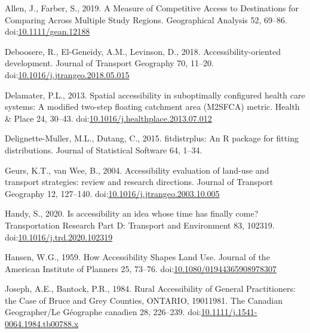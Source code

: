 \documentclass[]{elsarticle} %
\newlength{\cslhangindent}
\newlength{\cslentryspacingunit} %
\newenvironment{CSLReferences}[2] %
 {%
  \setlength{\parindent}{0pt}
  \ifodd #1
  \let\oldpar\par
  \def\par{\hangindent=\cslhangindent\oldpar}
  \fi
  \setlength{\parskip}{#2\cslentryspacingunit}
 }%
 {}
\begin{document}
\hypertarget{refs}{}
\begin{CSLReferences}{1}{0}
\leavevmode{}%
Allen, J., Farber, S., 2019. A Measure of Competitive Access to
Destinations for Comparing Across Multiple Study Regions. Geographical
Analysis 52, 69--86.
doi:\href{https://doi.org/10.1111/gean.12188}{10.1111/gean.12188}

\leavevmode{}%
Deboosere, R., El-Geneidy, A.M., Levinson, D., 2018.
Accessibility-oriented development. Journal of Transport Geography 70,
11--20.
doi:\href{https://doi.org/10.1016/j.jtrangeo.2018.05.015}{10.1016/j.jtrangeo.2018.05.015}

\leavevmode{}%
Delamater, P.L., 2013. Spatial accessibility in suboptimally configured
health care systems: A modified two-step floating catchment area
(M2SFCA) metric. Health \& Place 24, 30--43.
doi:\href{https://doi.org/10.1016/j.healthplace.2013.07.012}{10.1016/j.healthplace.2013.07.012}

\leavevmode{}%
Delignette-Muller, M.L., Dutang, C., 2015. {fitdistrplus}: An {R}
package for fitting distributions. Journal of Statistical Software 64,
1--34.

\leavevmode{}%
Geurs, K.T., van Wee, B., 2004. Accessibility evaluation of land-use and
transport strategies: review and research directions. Journal of
Transport Geography 12, 127--140.
doi:\href{https://doi.org/10.1016/j.jtrangeo.2003.10.005}{10.1016/j.jtrangeo.2003.10.005}

\leavevmode{}%
Handy, S., 2020. Is accessibility an idea whose time has finally come?
Transportation Research Part D: Transport and Environment 83, 102319.
doi:\href{https://doi.org/10.1016/j.trd.2020.102319}{10.1016/j.trd.2020.102319}

\leavevmode{}%
Hansen, W.G., 1959. How Accessibility Shapes Land Use. Journal of the
American Institute of Planners 25, 73--76.
doi:\href{https://doi.org/10.1080/01944365908978307}{10.1080/01944365908978307}

\leavevmode{}%
Joseph, A.E., Bantock, P.R., 1984. Rural Accessibility of General
Practitioners: the Case of Bruce and Grey Counties, ONTARIO,
1901{\textendash}1981. The Canadian Geographer/Le Géographe canadien 28,
226--239.
doi:\href{https://doi.org/10.1111/j.1541-0064.1984.tb00788.x}{10.1111/j.1541-0064.1984.tb00788.x}


\end{CSLReferences}
\end{document}
